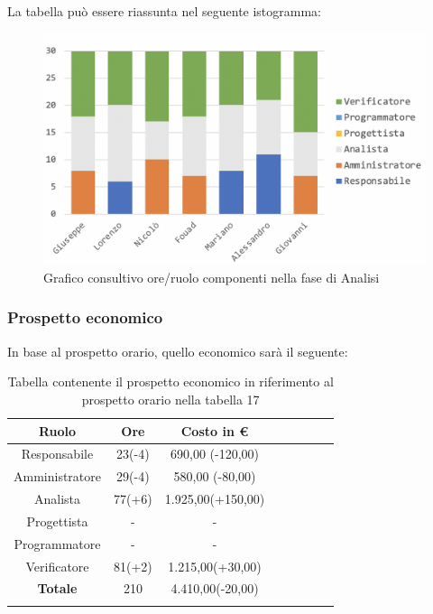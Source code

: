 			La tabella può essere riassunta nel seguente istogramma:
			
			\begin{figure}[H]
				\centering
				\includegraphics[width=0.8\linewidth]{./images/analisiCons1.png}
				\caption{Grafico consultivo ore/ruolo componenti nella fase di Analisi}
				\label{fig:consultivo grafico suddivione ruoli fase Analisi}
			\end{figure}
			
		\subsubsection{Prospetto economico}
			In base al prospetto orario, quello economico sarà il seguente: 
			
			\begin{longtable}{|c|c|c|c|c|c|c|c}
				\hline
				\rowcolor{lighter-grayer}
				\textbf{Ruolo} & \textbf{Ore} & \textbf{Costo in €} \\
				\hline
				\endfirsthead
				
				\hline
				Responsabile & 23(-4) & 690,00 (-120,00)\\
				\hline
				\hline
				Amministratore & 29(-4) & 580,00 (-80,00)\\
				\hline
				\hline
				Analista & 77(+6) & 1.925,00(+150,00)\\
				\hline
				\hline
				Progettista & - & -\\
				\hline
				\hline
				Programmatore & - & -\\
				\hline
				\hline
				Verificatore & 81(+2) & 1.215,00(+30,00)\\
				\hline
				\textbf{Totale} & 210 & 4.410,00(-20,00)\\
				\hline
				\caption{Tabella contenente il prospetto economico in riferimento al prospetto orario nella tabella 17}
			\end{longtable}
			\pagebreak
			

